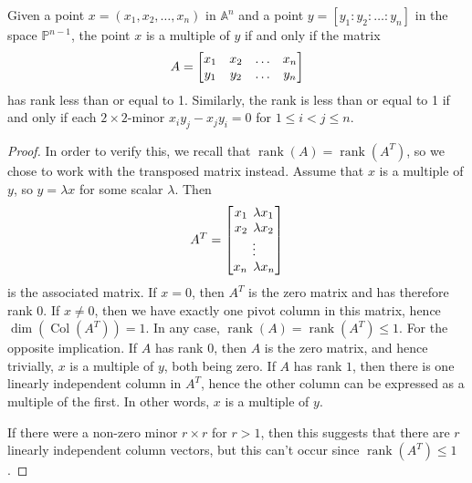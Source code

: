 \documentclass{article}
\newcommand{\A}{\ensuremath{\mathbb{A}}}
\renewcommand{\P}{\ensuremath{\mathbb{P}}}
\DeclareMathOperator{\Col}{Col}
\DeclareMathOperator{\rank}{rank}
\begin{document}
    \begin{proposition}
        \label{prop:point_line}
        Given a point $x = (x_1, x_2, \ldots, x_n)$ in $\A^n$ and a point $y =
        [y_1 : y_2 : \ldots : y_n]$ in the space $\P^{n-1}$, the point $x$ is a
        multiple of $y$ if and only if the matrix
        \begin{equation}
            \notag
            A = \begin{bmatrix}
                x_1 & x_2 & \hdots & x_n \\
                y_1 & y_2 & \hdots & y_n
            \end{bmatrix}
        \end{equation}
        has rank less than or equal to 1. Similarly, the rank is less than or
        equal to 1 if and only if each $2\times 2$-minor $x_iy_j - x_jy_i = 0$ for
        $1 \leq i < j \leq n$.
    \end{proposition} 
    \begin{proof}
        In order to verify this, we recall that $\rank(A) = \rank(A^T)$, so we
        chose to work with the transposed matrix instead. Assume that $x$ is a
        multiple of $y$, so $y = \lambda x$ for some scalar $\lambda$. Then
        \begin{equation}
            \notag
            A^T = \begin{bmatrix}
                x_1 \;\, \lambda x_1 \\
                x_2 \;\, \lambda x_2 \\
                \vdots \\
                x_n \;\, \lambda x_n
            \end{bmatrix}
        \end{equation}
        is the associated matrix. If $x = 0$, then $A^T$ is the zero matrix and
        has therefore rank 0. If $x \neq 0$, then we have exactly one pivot
        column in this matrix, hence $\dim(\Col(A^T)) = 1$. In any case,
        $\rank(A) = \rank(A^T) \leq 1$. For the opposite implication. If $A$
        has rank 0, then $A$ is the zero matrix, and hence trivially, $x$ is a
        multiple of $y$, both being zero. If $A$ has rank $1$, then there is
        one linearly independent column in $A^T$, hence the other column can be
        expressed as a multiple of the first. In other words, $x$ is a multiple
        of $y$.
        
        If there were a non-zero minor $r\times r$ for $r > 1$, then this
        suggests that there are $r$ linearly independent column vectors, but
        this can't occur since $\rank(A^T) \leq 1$.
    \end{proof}
    
\end{document}
